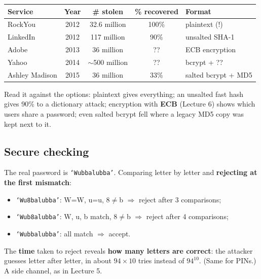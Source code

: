 \begin{exbox}[title={Password database compromises (source: T.\ Ristenpart)}]
\begin{center}
\small
\begin{tabular}{l|c|c|c|l}
\textbf{Service} & \textbf{Year} & \textbf{\# stolen} & \textbf{\% recovered} & \textbf{Format} \\ \hline
RockYou        & 2012 & 32.6 million & 100\% & plaintext (!) \\
LinkedIn       & 2012 & 117 million  & 90\%  & unsalted SHA-1 \\
Adobe          & 2013 & 36 million   & ??    & ECB encryption \\
Yahoo          & 2014 & $\sim$500 million & ?? & bcrypt + ?? \\
Ashley Madison & 2015 & 36 million   & 33\%  & salted bcrypt + MD5
\end{tabular}
\end{center}
Read it against the options: plaintext gives everything; an unsalted fast hash gives 90\% to a
dictionary attack; encryption with \textbf{ECB} (Lecture 6) shows which users share a password;
even salted bcrypt fell where a legacy MD5 copy was kept next to it.
\end{exbox}

\subsection{Secure checking}

\begin{warnbox}[title={Option 1: check letter by letter --- a timing channel}]
The real password is \texttt{`Wubbalubba'}. Comparing letter by letter and \textbf{rejecting at
the first mismatch}:
\begin{itemize}
  \item \texttt{`Wu8balubba'}: W=W, u=u, 8$\ne$b $\Rightarrow$ reject after 3 comparisons;
  \item \texttt{`Wub8alubba'}: W, u, b match, 8$\ne$b $\Rightarrow$ reject after 4 comparisons;
  \item \texttt{`Wubbalubba'}: all match $\Rightarrow$ accept.
\end{itemize}
The \textbf{time} taken to reject reveals \textbf{how many letters are correct}: the attacker
guesses letter after letter, in about $94 \times 10$ tries instead of $94^{10}$. (Same for PINs.)
A side channel, as in Lecture 5.
\end{warnbox}

